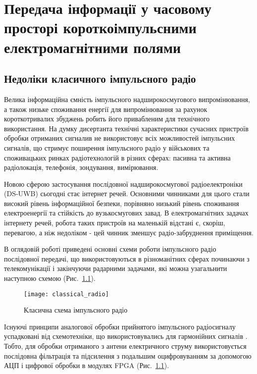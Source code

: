 \chapter{Передача інформації у часовому просторі короткоімпульсними 
електромагнітними полями}
\label{ch:neuron}

\section{Недоліки класичного імпульсного радіо}

Велика інформаційна ємність імпульсного надширокосмугового випромінювання, 
а також низьке споживання енергії для випромінювання за рахунок 
короткотривалих збуджень робить його привабленим для технічного використання.
На думку дисертанта технічні характеристики сучасних пристроїв обробки 
отриманих сигналив не використовує всіх можливостей імпульсних сигналів, що 
стримує поширення імпульсного радіо у військових та споживацьких ринках
радіотехнологій в різних сферах: пасивна та активна радіолокація, телефонія, 
зондування, вимірювання.

Новою сферою застосування послідовної надширокосмугової радіоелектроніки 
(DS-UWB) сьогодні стає інтернет речей. Основними чинниками для цього стали 
високий рівень інформаційної безпеки, порівняно низький рівень споживання 
електроенергії та стійкість до вузькосмугових завад. В електромагнітних 
задачах інтернету речей, робота таких пристроїв на маленькій відстані є, 
скоріш, перевагою, а ніж недоліком - цей чинник зменшує радіо-забруднення 
приміщення.

В оглядовій роботі \cite{imp:ChannelImplementation} приведені основні схеми
роботи імпульсного радіо послідовної передачі, що використовуються в 
різноманітних сферах починаючи з телекомунікації і закінчуючи радарними 
задачами, які можна узагальнити наступною схемою (Рис.~\ref{fig:emp_radio}).

\begin{figure}[htbp] \begin{center}
\texttt{[image: classical\_radio]}
\caption{Класична схема імпульсного радіо} \label{fig:emp_radio}
\end{center} \end{figure}

Існуючі принципи аналогової обробки прийнятого імпульсного радіосигналу 
успадковані від схемотехніки, що використовувались для гармонійних сигналів 
\cite{imp:ComunicationsOverview}. Тобто, для обробки отриманого з антени 
електричного струму використовується послідовна фільтрація та підсилення з 
подальшим оцифровуванням за допомогою АЦП і цифрової обробки в модулях FPGA 
(Рис.~\ref{fig:emp_radio}).

